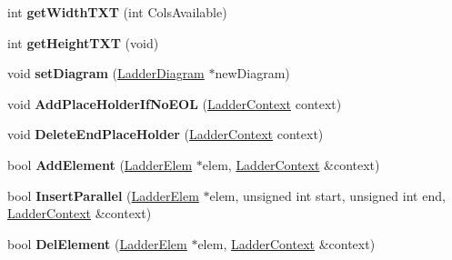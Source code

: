 \begin{DoxyCompactItemize}
\item 
\hypertarget{class_ladder_circuit_ab3f5556c4a97dd2a113a7dae0f7a6246}{int {\bfseries get\-Width\-T\-X\-T} (int Cols\-Available)}\label{class_ladder_circuit_ab3f5556c4a97dd2a113a7dae0f7a6246}

\item 
\hypertarget{class_ladder_circuit_a725b879995b1805d40b5e02112792856}{int {\bfseries get\-Height\-T\-X\-T} (void)}\label{class_ladder_circuit_a725b879995b1805d40b5e02112792856}

\item 
\hypertarget{class_ladder_circuit_ae10bef7e261dc3891690412d0f99b91e}{void {\bfseries set\-Diagram} (\hyperlink{class_ladder_diagram}{Ladder\-Diagram} $\ast$new\-Diagram)}\label{class_ladder_circuit_ae10bef7e261dc3891690412d0f99b91e}

\item 
\hypertarget{class_ladder_circuit_ac3cf9ce530c2d950f4a1f7ecb56a46c6}{void {\bfseries Add\-Place\-Holder\-If\-No\-E\-O\-L} (\hyperlink{struct_ladder_context}{Ladder\-Context} context)}\label{class_ladder_circuit_ac3cf9ce530c2d950f4a1f7ecb56a46c6}

\item 
\hypertarget{class_ladder_circuit_ab118f0dec69df370e4b326a8fb2c72f0}{void {\bfseries Delete\-End\-Place\-Holder} (\hyperlink{struct_ladder_context}{Ladder\-Context} context)}\label{class_ladder_circuit_ab118f0dec69df370e4b326a8fb2c72f0}

\item 
\hypertarget{class_ladder_circuit_a4219e61d00df41af771227fbd93ad72f}{bool {\bfseries Add\-Element} (\hyperlink{class_ladder_elem}{Ladder\-Elem} $\ast$elem, \hyperlink{struct_ladder_context}{Ladder\-Context} \&context)}\label{class_ladder_circuit_a4219e61d00df41af771227fbd93ad72f}

\item 
\hypertarget{class_ladder_circuit_a55e9e35a6e8d2905bee5be1380edeb7f}{bool {\bfseries Insert\-Parallel} (\hyperlink{class_ladder_elem}{Ladder\-Elem} $\ast$elem, unsigned int start, unsigned int end, \hyperlink{struct_ladder_context}{Ladder\-Context} \&context)}\label{class_ladder_circuit_a55e9e35a6e8d2905bee5be1380edeb7f}

\item 
\hypertarget{class_ladder_circuit_a3e963fc9f837c240ca663b5bcdd383d7}{bool {\bfseries Del\-Element} (\hyperlink{class_ladder_elem}{Ladder\-Elem} $\ast$elem, \hyperlink{struct_ladder_context}{Ladder\-Context} \&context)}\label{class_ladder_circuit_a3e963fc9f837c240ca663b5bcdd383d7}


\end{DoxyCompactItemize}
